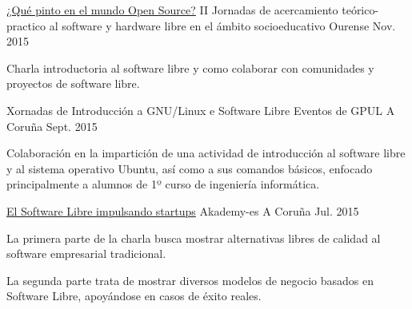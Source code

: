 


\begin{cventries}


\cventry
{\href{http://castrinho8.github.io/open-community/#/}{¿Qué pinto en el mundo Open Source?}} %
{II Jornadas de acercamiento teórico-practico al software y hardware libre en el ámbito socioeducativo} %
{Ourense} %
{Nov. 2015} %
{ %
\begin{cvitems}
\item {Charla introductoria al software libre y como colaborar con comunidades y proyectos de software libre.}
\end{cvitems}
}


\cventry
{Xornadas de Introducción a GNU/Linux e Software Libre} %
{Eventos de GPUL} %
{A Coruña} %
{Sept. 2015} %
{ %
\begin{cvitems}
\item {Colaboración en la impartición de una actividad de introducción al software libre y al sistema operativo Ubuntu, así como a sus comandos básicos, enfocado
principalmente a alumnos de 1º curso de ingeniería informática.}
\end{cvitems}
}


\cventry
{\href{http://castrinho8.github.io/akademy-startups-presentation/#/portada}{El Software Libre impulsando startups}} %
{Akademy-es} %
{A Coruña} %
{Jul. 2015} %
{ %
\begin{cvitems}
\item {La primera parte de la charla busca mostrar alternativas libres de calidad al software empresarial tradicional.}
\item {La segunda parte trata de mostrar diversos modelos de negocio basados en Software Libre, apoyándose en casos de éxito reales.}
\end{cvitems}
}



\end{cventries}